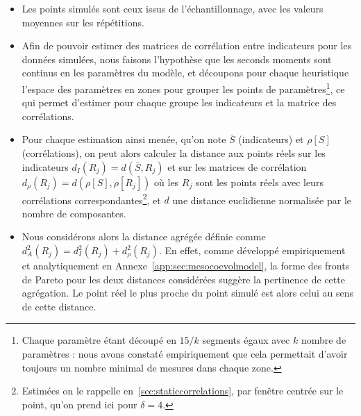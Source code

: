 {\begin{itemize}
	\item Les points simulés sont ceux issus de l'échantillonnage, avec les valeurs moyennes sur les répétitions.
	\item Afin de pouvoir estimer des matrices de corrélation entre indicateurs pour les données simulées, nous faisons l'hypothèse que les seconds moments sont continus en les paramètres du modèle, et découpons pour chaque heuristique l'espace des paramètres en zones pour grouper les points de paramètres\footnote{Chaque paramètre étant découpé en $15 / k$ segments égaux avec $k$ nombre de paramètres : nous avons constaté empiriquement que cela permettait d'avoir toujours un nombre minimal de mesures dans chaque zone.}, ce qui permet d'estimer pour chaque groupe les indicateurs et la matrice des corrélations.
	\item Pour chaque estimation ainsi menée, qu'on note $\bar{S}$ (indicateurs) et $\rho [S]$ (corrélations), on peut alors calculer la distance aux points réels sur les indicateurs $d_I (R_j) = d(\bar{S},R_j)$ et sur les matrices de corrélation $d_{\rho} (R_j) = d(\rho [S],\rho[R_j])$ où les $R_j$ sont les points réels avec leurs corrélations correspondantes\footnote{Estimées on le rappelle en~\ref{sec:staticcorrelations}, par fenêtre centrée sur le point, qu'on prend ici pour $\delta = 4$.}, et $d$ une distance euclidienne normalisée par le nombre de composantes.
	\item Nous considérons alors la distance agrégée définie comme $d_A^2 (R_j) = d_I^2 (R_j) + d_{\rho}^2 (R_j)$. En effet, comme développé empiriquement et analytiquement en Annexe~\ref{app:sec:mesocoevolmodel}, la forme des fronts de Pareto pour les deux distances considérées suggère la pertinence de cette agrégation. Le point réel le plus proche du point simulé est alors celui au sens de cette distance.
\end{itemize}
}







